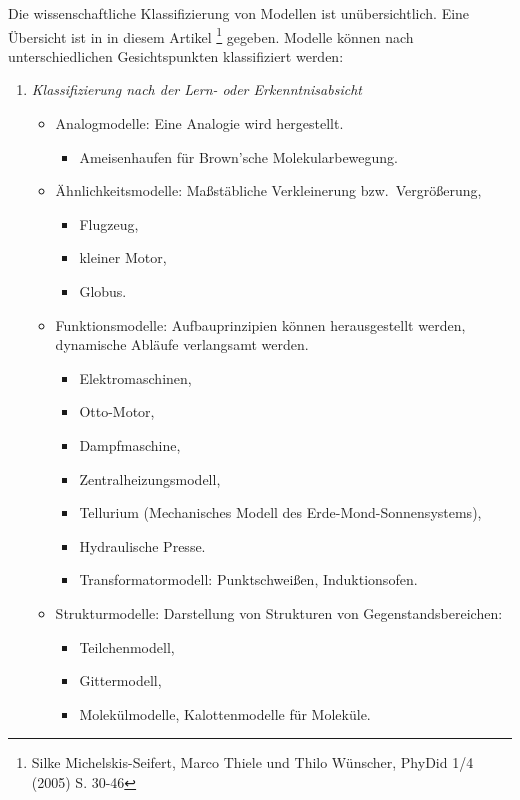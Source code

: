\mip
Die wissenschaftliche Klassifizierung von Modellen ist un\"{u}bersichtlich. Eine \"{U}bersicht ist in in diesem Artikel \footnote{Silke Michelskis-Seifert, Marco Thiele und Thilo W\"{u}nscher, PhyDid 1/4 (2005) S. 30-46} gegeben. Modelle k\"{o}nnen nach unterschiedlichen Gesichtspunkten klassifiziert werden:

\begin{enumerate}
\item{\it{Klassifizierung nach der Lern- oder Erkenntnisabsicht}}
\begin{itemize}
\item
Analogmodelle: Eine Analogie wird hergestellt.
\begin{itemize}
\item Ameisenhaufen f\"{u}r Brown'sche Molekularbewegung.
\end{itemize}

\item
\"{A}hnlichkeitsmodelle: Ma{\ss}st\"{a}bliche Verkleinerung bzw.\ Vergr\"{o}{\ss}erung,
\begin{itemize}
\item Flugzeug,
\item kleiner Motor,
\item Globus.
\end{itemize}

\item
Funktionsmodelle:  Aufbauprinzipien k\"{o}nnen herausgestellt
werden, dynamische Abl\"{a}ufe verlangsamt werden.
\begin{itemize}
\item Elektromaschinen,
\item Otto-Motor,
\item Dampfmaschine,
\item Zentralheizungsmodell,
\item Tellurium (Mechanisches Modell des Erde-Mond-Sonnensystems),
\item Hydraulische Presse.
\item Transformatormodell: Punktschwei{\ss}en, Induktionsofen.
\end{itemize}

\item
Strukturmodelle:
Darstellung von Strukturen von Gegenstandsbereichen:
\begin{itemize}
\item Teilchenmodell,
\item Gittermodell,
\item Molek\"{u}lmodelle, Kalottenmodelle f\"{u}r Molek\"{u}le.
\end{itemize}


\end{itemize}
\end{enumerate}
